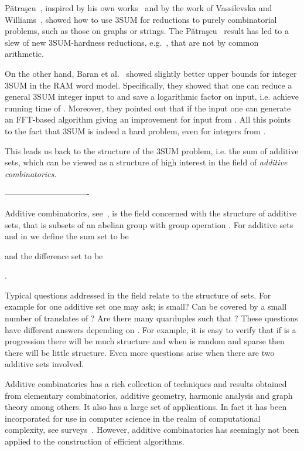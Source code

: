 \documentclass[11pt]{article}
\begin{document}
{P\u{a}tra\c{s}cu~\cite{Patrascu10}, inspired by his own works~\cite{BDP08,PW10} and by the work of Vassilevska and Williams~\cite{VW09}, showed how  to use 3SUM for reductions to purely combinatorial problems, such as those on graphs or strings. The P\u{a}tra\c{s}cu~\cite{Patrascu10} result has led to a slew of new 3SUM-hardness reductions, e.g.~\cite{AWW14,ACLL14,JV13,KPP14}, that are not by common arithmetic.

On the other hand, Baran et al.~\cite{BDP08} showed slightly better upper bounds for integer 3SUM in the RAM word model. Specifically, they showed that one can reduce a general 3SUM integer input to  and save a logarithmic factor on  input, i.e. achieve running time of . Moreover, they pointed out that if the input  one can generate an  FFT-based algorithm giving an improvement for input from . All this points to the fact that 3SUM is indeed a hard problem, even for integers from .

This leads us back to the structure of the 3SUM problem, i.e. the sum of additive sets, which can be viewed as a structure of high interest in the field of {\em additive combinatorics}.



-------------------------------




Additive combinatorics, see~\cite{TV06}, is the field concerned with the structure of additive sets, that is subsets of an abelian group  with group operation . For additive sets  and  in  we define the sum set to be



and the difference set to be

.


Typical questions addressed in the field relate to the structure of sets. For example for one additive set one may ask; is  small? Can  be covered by a small number of translates of ? Are there many quarduples  such that ? These questions have different answers depending on . For example, it is easy to verify that if  is a progression there will be much structure and when  is random and sparse then there will be little structure. Even more questions arise when there are two additive sets involved.

Additive combinatorics has a rich collection of techniques and results obtained from elementary combinatorics, additive geometry, harmonic analysis and graph theory among others. It also has a large set of applications. In fact it has been incorporated for use in computer science in the realm of computational complexity, see surveys~\cite{Lovett14,Viola11}. However, additive combinatorics has seemingly not been applied to the construction of efficient algorithms.

}
\end{document}
